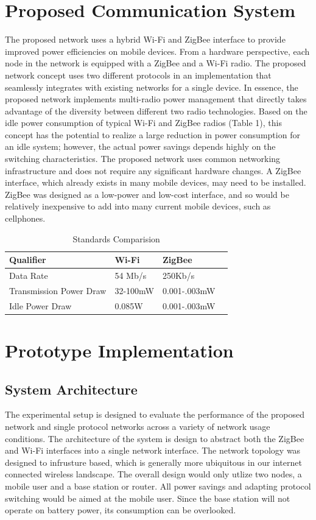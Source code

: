\documentclass[conference]{IEEEtran}
\begin{document}
\section{Proposed Communication System}
The proposed network uses a hybrid Wi-Fi and ZigBee interface to provide improved power efficiencies on mobile devices.   From a hardware perspective, each node in the network is equipped with a ZigBee and a Wi-Fi radio. The proposed network concept uses two different protocols in an implementation that seamlessly integrates with existing networks for a single device. In essence, the proposed network implements multi-radio power management that directly takes advantage of the diversity between different two radio technologies. Based on the idle power consumption of typical Wi-Fi and ZigBee radios (Table 1), this concept has the potential to realize a large reduction in power consumption for an idle system; however, the actual power savings depends highly on the switching characteristics. The proposed network uses common networking infrastructure and does not require any significant hardware changes. A ZigBee interface, which already exists in many mobile devices, may need to be installed. ZigBee was designed as a low-power and low-cost interface, and so would be relatively inexpensive to add into many current mobile devices, such as cellphones. 

\setcounter{table}{1}
\begin{table}[h!b!p!]
\caption{Standards Comparision\cite{eight,six,nine,ten,eleven,fourteen}}
\begin{center}
\begin{tabular}{llll}
\hline
Qualifier & Wi-Fi & ZigBee\\
\hline
Data Rate & 54 Mb/s & 250Kb/s\\
Transmission Power Draw & 32-100mW & 0.001-.003mW\\
Idle Power Draw & 0.085W & 0.001-.003mW\\
\hline
\end{tabular}
\end{center}
\label{table2}
\end{table}

\section{Prototype Implementation}
\subsection{System Architecture}
The experimental setup is designed to evaluate the performance of the proposed network and single protocol networks across a variety of network usage conditions.  The architecture of the system is design to abstract both the ZigBee and Wi-Fi interfaces into a single network interface.  The network topology was designed to infrusture based, which is generally more ubiquitous in our internet connected wireless landscape. The overall design would only utlize two nodes, a mobile user and a base station or router.  All power savings and adapting protocol switching would be aimed at the mobile user.  Since the base station will not operate on battery power, its consumption can be overlooked.
\end{document}
